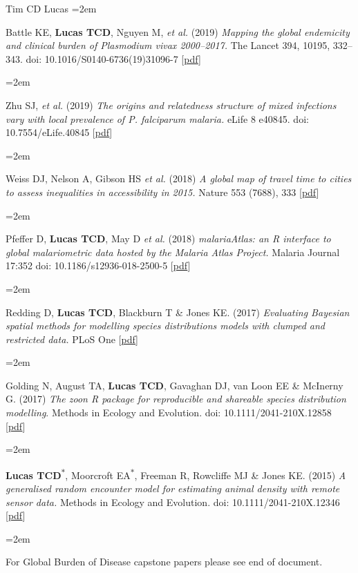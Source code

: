 \documentclass{scrartcl}
\newcommand{\MarginText}[1]{\marginpar{\raggedleft\itshape\small#1}} %
\newcommand{\Description}[1]{\hangindent=2em\hangafter=0\noindent\raggedright\footnotesize{#1}\par\normalsize\vspace{1em}} %
\begin{document}
\begin{cv}{Tim {\Large CD} Lucas}
\Description{Battle KE, \textbf{Lucas TCD},  Nguyen M, \emph{et al.} (2019) \emph{Mapping the global endemicity and clinical burden of \emph{Plasmodium vivax} 2000--2017.} The Lancet 394, 10195, 332--343. doi: 10.1016/S0140-6736(19)31096-7 [\href{https://doi.org/10.1016/S0140-6736(19)31096-7}{pdf}]}



\Description{Zhu SJ, \emph{et al.} (2019) \emph{The origins and relatedness structure of mixed infections vary with local prevalence of \emph{P. falciparum} malaria.} eLife 8 e40845. doi: 10.7554/eLife.40845 [\href{https://doi.org/10.7554/eLife.40845}{pdf}]}




\Description{\MarginText{2018}Weiss DJ, Nelson A, Gibson HS \emph{et al.} (2018) \emph{A global map of travel time to cities to assess inequalities in accessibility in 2015.} Nature 553 (7688), 333 [\href{https://www.nature.com/articles/nature25181.pdf}{pdf}]}

\Description{Pfeffer D, \textbf{Lucas TCD}, May D \emph{et al.} (2018) \emph{malariaAtlas: an R interface to global malariometric data hosted by the Malaria Atlas Project.} Malaria Journal 17:352 doi: 10.1186/s12936-018-2500-5 [\href{https://malariajournal.biomedcentral.com/track/pdf/10.1186/s12936-018-2500-5}{pdf}]}


\Description{\MarginText{2017}Redding D, \textbf{Lucas TCD}, Blackburn T \& Jones KE. (2017) \emph{Evaluating Bayesian spatial methods for modelling species distributions models with clumped and restricted data.} PLoS One [\href{https://journals.plos.org/plosone/article/file?id=10.1371/journal.pone.0187602&type=printable}{pdf}]}

\Description{Golding N, August TA, \textbf{Lucas TCD}, Gavaghan DJ, van Loon EE \& McInerny G. (2017) \emph{The zoon R package for reproducible and shareable species distribution modelling}. Methods in Ecology and Evolution. doi: 10.1111/2041-210X.12858 [\href{http://onlinelibrary.wiley.com/doi/10.1111/2041-210X.12858/pdf}{pdf}]}

\Description{\MarginText{2015}\textbf{Lucas TCD}\textsuperscript{$\ast$}, Moorcroft EA\textsuperscript{$\ast$}, Freeman R, Rowcliffe MJ \& Jones KE. (2015) \emph{A generalised random encounter model for estimating animal density with remote sensor data.} Methods in Ecology and Evolution. doi: 10.1111/2041-210X.12346 [\href{http://onlinelibrary.wiley.com/doi/10.1111/2041-210X.12346/epdf}{pdf}]}


\Description{\MarginText{GBD}For Global Burden of Disease capstone papers please see end of document.}


\end{cv}
\end{document}
